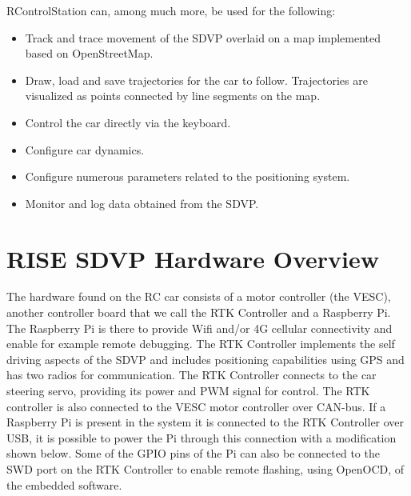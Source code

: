 \documentclass[12pt]{article} %
\begin{document}
RControlStation can, among much more, be used for the following:
\begin{itemize}
\item Track and trace movement of the SDVP overlaid on a map
  implemented based on OpenStreetMap.
\item Draw, load and save trajectories for the car to
  follow. Trajectories are visualized as points connected by line
  segments on the map.
\item Control the car directly via the keyboard.
\item Configure car dynamics.
\item Configure numerous parameters related to the positioning system.
\item Monitor and log data obtained from the SDVP. 
\end{itemize} 

\section{RISE SDVP Hardware Overview} 

The hardware found on the RC car consists of a motor controller (the
VESC), another controller board that we call the RTK Controller and a
Raspberry Pi.  The Raspberry Pi is there to provide Wifi and/or 4G
cellular connectivity and enable for example remote debugging. The RTK
Controller implements the self driving aspects of the SDVP and
includes positioning capabilities using GPS and has two radios for
communication. The RTK Controller connects to the car steering servo,
providing its power and PWM signal for control. The RTK controller is
also connected to the VESC motor controller over CAN-bus. If a
Raspberry Pi is present in the system it is connected to the RTK
Controller over USB, it is possible to power the Pi through this
connection with a modification shown below. Some of the GPIO pins of
the Pi can also be connected to the SWD port on the RTK Controller to
enable remote flashing, using OpenOCD, of the embedded software.

\vspace{5mm}
\end{document}
